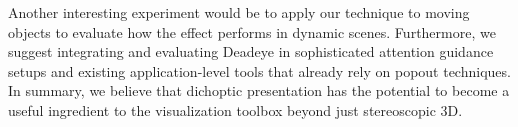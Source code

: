 \documentclass[journal]{vgtc}                %
\begin{document}
Another interesting experiment would be to apply our technique to moving objects to evaluate how the effect performs in dynamic scenes. Furthermore, we suggest integrating and evaluating Deadeye in sophisticated attention guidance setups and existing application-level tools that already rely on popout techniques. In summary, we believe that dichoptic presentation has the potential to become a useful ingredient to the visualization toolbox beyond just stereoscopic 3D.


%

%
%
%


\end{document}
